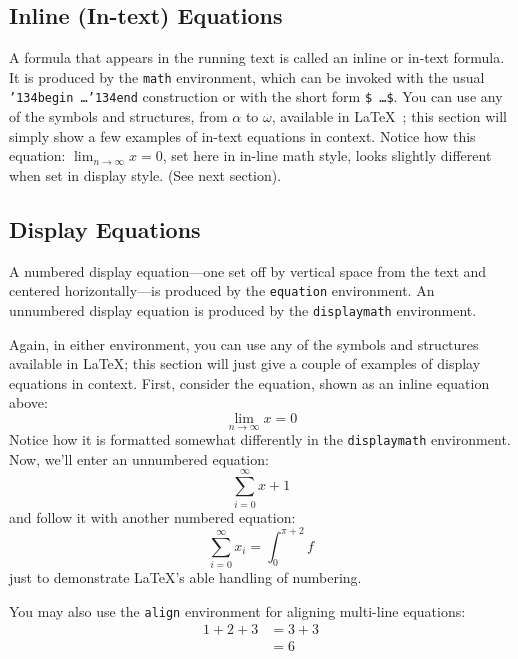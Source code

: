 \subsection{Inline (In-text) Equations}
A formula that appears in the running text is called an inline or
in-text formula.  It is produced by the \texttt{math} environment,
which can be invoked with the usual
\texttt{{\char'134}begin\,\ldots{\char'134}end} construction or with
the short form \texttt{\$\,\ldots\$}. You can use any of the symbols
and structures, from $\alpha$ to $\omega$, available in
\LaTeX~\parencite{Lamport:LaTeX}; this section will simply show a few
examples of in-text equations in context. Notice how this equation:
\begin{math}
  \lim_{n\rightarrow \infty}x=0
\end{math},
set here in in-line math style, looks slightly different when
set in display style.  (See next section).

\subsection{Display Equations}
A numbered display equation---one set off by vertical space from the
text and centered horizontally---is produced by the \texttt{equation}
environment. An unnumbered display equation is produced by the
\texttt{displaymath} environment.

Again, in either environment, you can use any of the symbols and
structures available in \LaTeX\@; this section will just give a couple
of examples of display equations in context.  First, consider the
equation, shown as an inline equation above:
\begin{equation}
  \lim_{n\rightarrow \infty}x=0
\end{equation}
Notice how it is formatted somewhat differently in
the \texttt{displaymath}
environment.  Now, we'll enter an unnumbered equation:
\begin{displaymath}
  \sum_{i=0}^{\infty} x + 1
\end{displaymath}
and follow it with another numbered equation:
\begin{equation}
  \sum_{i=0}^{\infty}x_i=\int_{0}^{\pi+2} f
\end{equation}
just to demonstrate \LaTeX's able handling of numbering.

You may also use the \texttt{align} environment for aligning
multi-line equations:
\begin{align}
    \label{eq:123}
    1 + 2 + 3 &= 3 + 3\\
    \label{eq:33}
    &= 6
\end{align}

